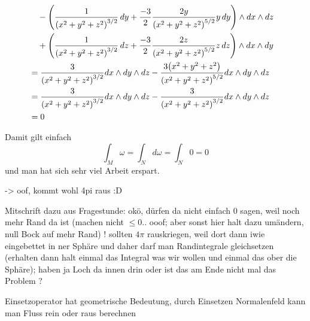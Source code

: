 \documentclass[../H_Analysis_main.tex]{subfiles}
\begin{document}
\begin{bsp}
\begin{align*}
\\
& \quad - \qty(\frac{1}{\qty(x^2 + y^2 + z^2)^{3/2}} \, dy + \frac{-3}{2} \frac{2 y}{\qty(x^2 + y^2 + z^2)^{5/2}} y \, dy) \wedge dx \wedge dz
\\
& \quad + \qty(\frac{1}{\qty(x^2 + y^2 + z^2)^{3/2}} \, dz + \frac{-3}{2} \frac{2 z}{\qty(x^2 + y^2 + z^2)^{5/2}} z \, dz) \wedge dx \wedge dy
\\
&= \frac{3}{\qty(x^2 + y^2 + z^2)^{3/2}} dx \wedge dy \wedge dz - \frac{3 \qty(x^2 + y^2 + z^2)}{\qty(x^2 + y^2 + z^2)^{5/2}} dx \wedge dy \wedge dz
\\
&= \frac{3}{\qty(x^2 + y^2 + z^2)^{3/2}} dx \wedge dy \wedge dz - \frac{3}{\qty(x^2 + y^2 + z^2)^{3/2}} dx \wedge dy \wedge dz
\\
&= 0
\end{align*}

Damit gilt einfach
\begin{equation}
\int_M \omega = \int_N d\omega = \int_N 0 = 0
\end{equation}
und man hat sich sehr viel Arbeit erspart.

-> oof, kommt wohl 4pi raus :D

Mitschrift dazu aus Fragestunde: okö, dürfen da nicht einfach 0 sagen, weil noch mehr Rand da ist (machen nicht $\leq 0$.. ooof; aber sonst hier halt dazu umändern, null Bock auf mehr Rand) ! sollten $4 \pi$ rauskriegen, weil dort dann iwie eingebettet in ner Sphäre und daher darf man Randintegrale gleichsetzen (erhalten dann halt einmal das Integral was wir wollen und einmal das ober die Sphäre); haben ja Loch da innen drin oder ist das am Ende nicht mal das Problem ?
\end{bsp}

\iffalse
\begin{figure}
\centering

\caption[Oberfläche Ellipsoid]{Veranschaulichung der Oberfläche des Ellipsoids, also der Niveaumenge $2x^2 + 3y^2 + 4z^2 = 1$. Es wurde hier extra ein Teil abgeschnitten, damit erkennbar ist, dass es sich nur um den Rand handelt.}
\label{fig:stokes_ellipsoid_rand}
\end{figure}
\fi


Einsetzoperator hat geometrische Bedeutung, durch Einsetzen Normalenfeld kann man Fluss rein oder raus berechnen





\newpage
\end{document}
